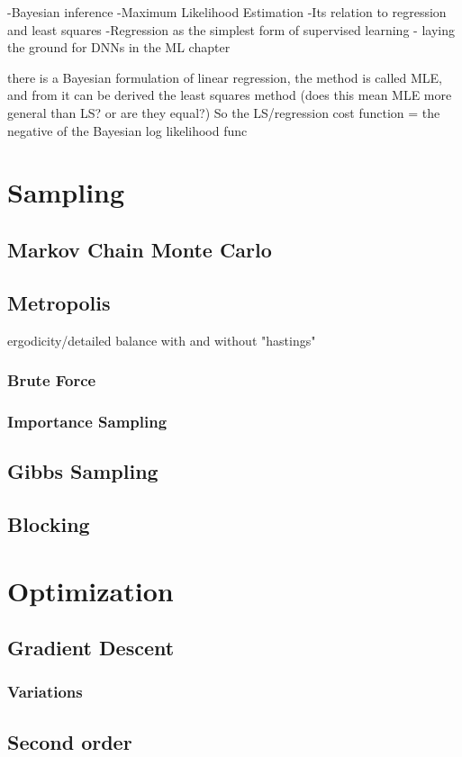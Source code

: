\documentclass[twoside,english]{uiofysmaster}
\begin{document}
-Bayesian inference
-Maximum Likelihood Estimation
-Its relation to regression and least squares
-Regression as the simplest form of supervised learning - laying the ground for DNNs in the ML chapter

there is a Bayesian formulation of linear regression, the method is called MLE, and from it can be derived the least squares method (does this mean MLE more general than LS? or are they equal?)
So the LS/regression cost function = the negative of the Bayesian log likelihood func

\section{Sampling}
\subsection{Markov Chain Monte Carlo}
\subsection{Metropolis}
ergodicity/detailed balance
with and without "hastings"
\subsubsection{Brute Force}
\subsubsection{Importance Sampling}

\subsection{Gibbs Sampling}
\subsection{Blocking}

\section{Optimization}
\subsection{Gradient Descent}
\subsubsection{Variations}
\subsection{Second order}
\end{document}
